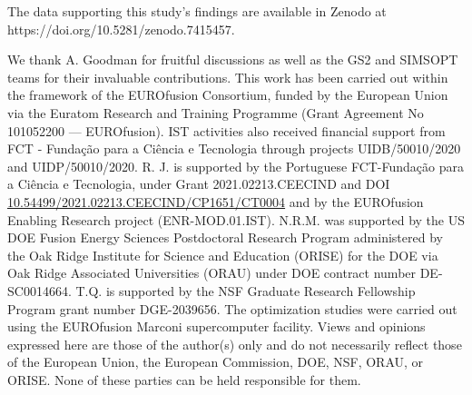 \documentclass[prl,twocolumn,amsmath,amssymb,showpacs,superscriptaddress]{revtex4-2}
\begin{document}
The data supporting this study's findings are available in Zenodo at https://doi.org/10.5281/zenodo.7415457.%


We thank A. Goodman for fruitful discussions as well as the GS2 and SIMSOPT teams for their invaluable contributions.
%
This work has been carried out within the framework of the EUROfusion Consortium, funded by the European Union via the Euratom Research and Training Programme (Grant Agreement No 101052200 — EUROfusion).  
%
IST activities also received financial support from FCT - Fundação para a Ciência e Tecnologia through projects UIDB/50010/2020 and UIDP/50010/2020.
%
R. J. is supported by the Portuguese FCT-Fundação para a Ciência e Tecnologia, under Grant 2021.02213.CEECIND and DOI  \href{https://doi.org/10.54499/2021.02213.CEECIND/CP1651/CT0004}{10.54499/2021.02213.CEECIND/CP1651/CT0004} and by the EUROfusion Enabling Research project (ENR-MOD.01.IST). 
%
N.R.M. was supported by the US DOE Fusion Energy Sciences Postdoctoral Research Program
administered by the Oak Ridge Institute for Science and Education (ORISE) for the DOE via Oak Ridge
Associated Universities (ORAU) under DOE contract number DE-SC0014664.
%
T.Q. is supported by the NSF Graduate Research Fellowship Program grant number DGE-2039656.
%
The optimization studies were carried out using the
EUROfusion Marconi supercomputer facility.
%
Views and opinions expressed here are those of the author(s) only and do not necessarily reflect those of the European Union, the European Commission, DOE, NSF, ORAU, or ORISE. None of these parties can be held responsible for them.

% 
% 


\end{document}

